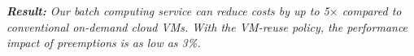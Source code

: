 \noindent \emph{\textbf{Result:} Our batch computing service can reduce costs by up to 5$\times$ compared to conventional on-demand cloud VMs. With the VM-reuse policy, the performance impact of preemptions is as low as 3\%.}









